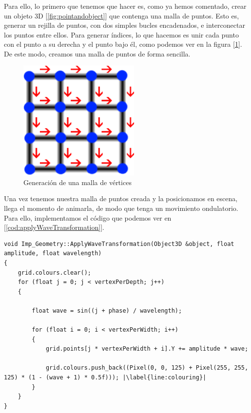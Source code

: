 Para ello, lo primero que tenemos que hacer es, como ya hemos comentado, crear un objeto 3D [\ref{fig:pointandobject}] que contenga una malla de puntos. Esto es, generar un rejilla de puntos, con dos simples bucles encadenados, e interconectar los puntos entre ellos. Para generar índices, lo que hacemos es unir cada punto con el punto a su derecha y el punto bajo él, como podemos ver en la figura [\ref{fig:grid}]. De este modo, creamos una malla de puntos de forma sencilla.\\

\begin{figure}[h]
	\centering
	\includegraphics[width=6cm]{archivos/grid}
	\caption{Generación de una malla de vértices}
	\label{fig:grid}
\end{figure}

Una vez tenemos nuestra malla de puntos creada y la posicionamos en escena, llega el momento de animarla, de modo que tenga un movimiento ondulatorio. Para ello, implementamos el código que podemos ver en [\ref{cod:applyWaveTransformation}].\\

\begin{lstlisting}[style=C-color, caption={Aplicación de una deformación de onda a nuestra malla de puntos},label=cod:applyWaveTransformation, escapechar=|]
void Imp_Geometry::ApplyWaveTransformation(Object3D &object, float amplitude, float wavelength)
{
    grid.colours.clear();
    for (float j = 0; j < vertexPerDepth; j++)
    {
    
        float wave = sin((j + phase) / wavelength);
    
        for (float i = 0; i < vertexPerWidth; i++)
        {
            grid.points[j * vertexPerWidth + i].Y += amplitude * wave;
            
            grid.colours.push_back((Pixel(0, 0, 125) + Pixel(255, 255, 125) * (1 - (wave + 1) * 0.5f))); |\label{line:colouring}|
        }
    }
}
\end{lstlisting}


